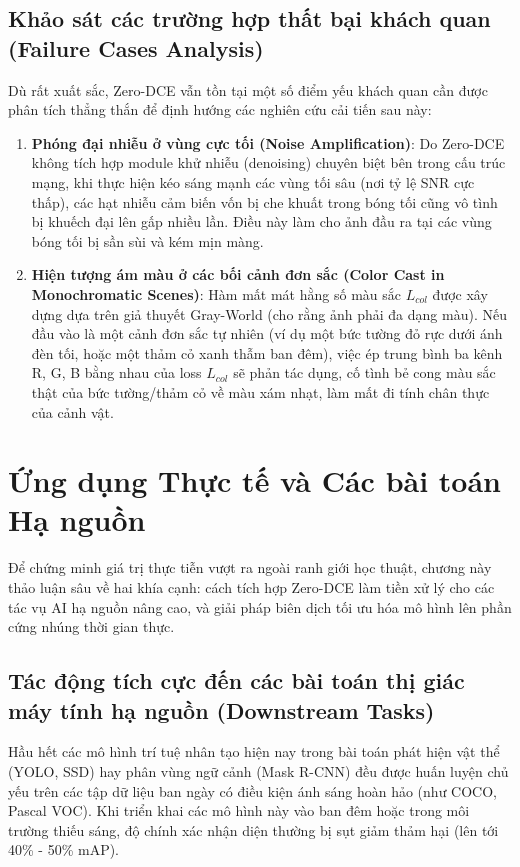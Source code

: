 \documentclass[a4paper]{article}
\begin{document}
\subsection{Khảo sát các trường hợp thất bại khách quan (Failure Cases Analysis)}
Dù rất xuất sắc, Zero-DCE vẫn tồn tại một số điểm yếu khách quan cần được phân tích thẳng thắn để định hướng các nghiên cứu cải tiến sau này:
\begin{enumerate}
    \item \textbf{Phóng đại nhiễu ở vùng cực tối (Noise Amplification)}: Do Zero-DCE không tích hợp module khử nhiễu (denoising) chuyên biệt bên trong cấu trúc mạng, khi thực hiện kéo sáng mạnh các vùng tối sâu (nơi tỷ lệ SNR cực thấp), các hạt nhiễu cảm biến vốn bị che khuất trong bóng tối cũng vô tình bị khuếch đại lên gấp nhiều lần. Điều này làm cho ảnh đầu ra tại các vùng bóng tối bị sần sùi và kém mịn màng.
    \item \textbf{Hiện tượng ám màu ở các bối cảnh đơn sắc (Color Cast in Monochromatic Scenes)}: Hàm mất mát hằng số màu sắc $L_{col}$ được xây dựng dựa trên giả thuyết Gray-World (cho rằng ảnh phải đa dạng màu). Nếu đầu vào là một cảnh đơn sắc tự nhiên (ví dụ một bức tường đỏ rực dưới ánh đèn tối, hoặc một thảm cỏ xanh thẫm ban đêm), việc ép trung bình ba kênh R, G, B bằng nhau của loss $L_{col}$ sẽ phản tác dụng, cố tình bẻ cong màu sắc thật của bức tường/thảm cỏ về màu xám nhạt, làm mất đi tính chân thực của cảnh vật.
\end{enumerate}

\clearpage

\section{Ứng dụng Thực tế và Các bài toán Hạ nguồn}

Để chứng minh giá trị thực tiễn vượt ra ngoài ranh giới học thuật, chương này thảo luận sâu về hai khía cạnh: cách tích hợp Zero-DCE làm tiền xử lý cho các tác vụ AI hạ nguồn nâng cao, và giải pháp biên dịch tối ưu hóa mô hình lên phần cứng nhúng thời gian thực.

\subsection{Tác động tích cực đến các bài toán thị giác máy tính hạ nguồn (Downstream Tasks)}
Hầu hết các mô hình trí tuệ nhân tạo hiện nay trong bài toán phát hiện vật thể (YOLO, SSD) hay phân vùng ngữ cảnh (Mask R-CNN) đều được huấn luyện chủ yếu trên các tập dữ liệu ban ngày có điều kiện ánh sáng hoàn hảo (như COCO, Pascal VOC). Khi triển khai các mô hình này vào ban đêm hoặc trong môi trường thiếu sáng, độ chính xác nhận diện thường bị sụt giảm thảm hại (lên tới 40\% - 50\% mAP).
\end{document}
